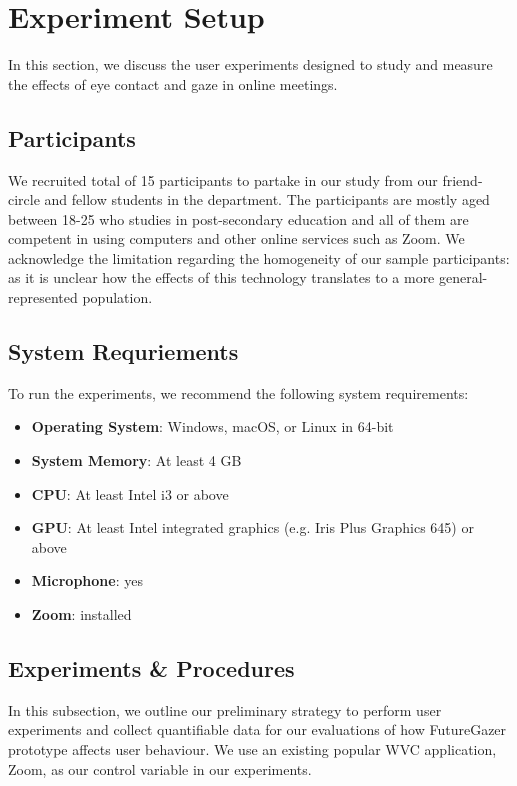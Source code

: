 \section{Experiment Setup}

In this section, we discuss the user experiments designed to study and measure the effects of eye contact and gaze in online meetings. 

\subsection{Participants}

We recruited total of 15 participants to partake in our study from our friend-circle and fellow students in the department.
The participants are mostly aged between 18-25 who studies in post-secondary education and all of them are competent in using computers
and other online services such as Zoom. 
We acknowledge the limitation regarding the homogeneity of our sample participants: as it is unclear
how the effects of this technology translates to a more general-represented population.

\subsection{System Requriements}

To run the experiments, we recommend the following system requirements:

\begin{itemize}
    \item \textbf{Operating System}: Windows, macOS, or Linux in 64-bit
    \item \textbf{System Memory}: At least 4 GB
    \item \textbf{CPU}: At least Intel i3 or above
    \item \textbf{GPU}: At least Intel integrated graphics (e.g. Iris Plus Graphics 645) or above
    \item \textbf{Microphone}: yes
    \item \textbf{Zoom}: installed
\end{itemize}

\subsection{Experiments \& Procedures}\label{section:exp-proc}

In this subsection, we outline our preliminary strategy to perform user experiments and collect quantifiable data for our evaluations of how FutureGazer prototype affects user behaviour. We use an existing popular WVC application, Zoom, as our control variable in our experiments. 

